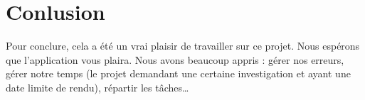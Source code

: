 \documentclass[
]{article}
\begin{document}
\hypertarget{conlusion}{%
\section{Conlusion}\label{conlusion}}

Pour conclure, cela a été un vrai plaisir de travailler sur ce projet.
Nous espérons que l'application vous plaira. Nous avons beaucoup appris
: gérer nos erreurs, gérer notre temps (le projet demandant une certaine
investigation et ayant une date limite de rendu), répartir les
tâches\ldots{}
\end{document}
